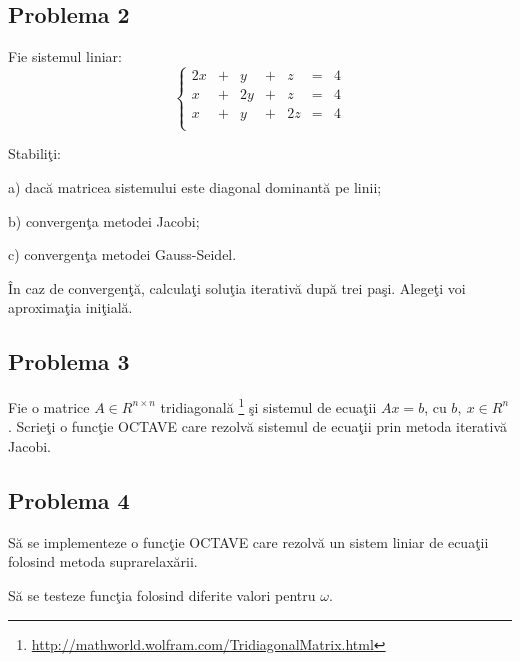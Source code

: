 \documentclass{exam}
\newcommand{\octavescript}[2]{
	
}
\begin{document}


\subsection{Problema 2}
Fie sistemul liniar:
$$	\left\{
	\begin{array}{ccccccc}
		2x & + & y  & + & z  & = & 4 \\
		x  & + & 2y & + & z  & = & 4 \\
		x  & + & y  & + & 2z & = & 4 \\
	\end{array} \right.
$$

Stabili\c{t}i:

a) dac\u{a} matricea sistemului este diagonal dominant\u{a} pe linii;

b) convergen\c{t}a metodei Jacobi;

c) convergen\c{t}a metodei Gauss-Seidel.

\^{I}n caz de convergen\c{t}\u{a}, calcula\c{t}i solu\c{t}ia iterativ\u{a} dup\u{a} trei pa\c{s}i. Alege\c{t}i voi aproxima\c{t}ia ini\c{t}ial\u{a}.


\subsection{Problema 3}
Fie o matrice $A \in R^{n\times n}$ tridiagonal\u{a} \footnote{\url{http://mathworld.wolfram.com/TridiagonalMatrix.html}} \c{s}i sistemul de ecua\c{t}ii $Ax=b$, cu $b,\ x \in R^{n}$. Scrie\c{t}i o func\c{t}ie OCTAVE care rezolv\u{a} sistemul de ecua\c{t}ii prin metoda iterativ\u{a} Jacobi.

\octavescript{./src/Jacobi.m}{Algoritmul Jacobi}

\subsection{Problema 4}
S\u{a} se implementeze o func\c{t}ie OCTAVE care rezolv\u{a} un sistem liniar de ecua\c{t}ii folosind metoda suprarelax\u{a}rii.
\octavescript{./src/sor.m}{Suprarelaxare}

S\u{a} se testeze func\c{t}ia folosind diferite valori pentru $\omega$.
\end{document}
